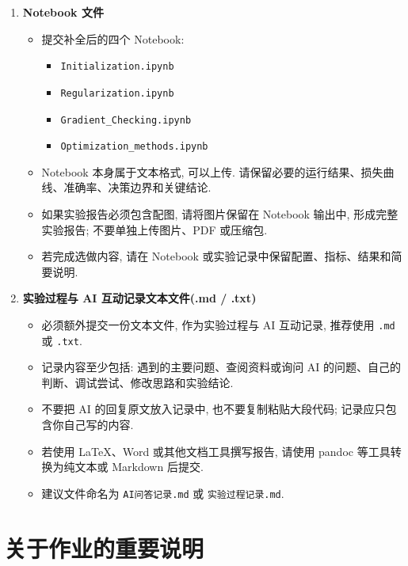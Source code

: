 \documentclass{../../nndlcourse}
\begin{document}
\begin{enumerate}
    \item \textbf{Notebook 文件}
    \begin{itemize}
        \item 提交补全后的四个 Notebook:
        \begin{itemize}
            \item \texttt{Initialization.ipynb}
            \item \texttt{Regularization.ipynb}
            \item \texttt{Gradient\_Checking.ipynb}
            \item \texttt{Optimization\_methods.ipynb}
        \end{itemize}
        \item Notebook 本身属于文本格式, 可以上传. 请保留必要的运行结果、损失曲线、准确率、决策边界和关键结论.
        \item 如果实验报告必须包含配图, 请将图片保留在 Notebook 输出中, 形成完整实验报告; 不要单独上传图片、PDF 或压缩包.
        \item 若完成选做内容, 请在 Notebook 或实验记录中保留配置、指标、结果和简要说明.
    \end{itemize}
    \item \textbf{实验过程与 AI 互动记录文本文件(.md / .txt)}
    \begin{itemize}
        \item 必须额外提交一份文本文件, 作为实验过程与 AI 互动记录, 推荐使用 \texttt{.md} 或 \texttt{.txt}.
        \item 记录内容至少包括: 遇到的主要问题、查阅资料或询问 AI 的问题、自己的判断、调试尝试、修改思路和实验结论.
        \item 不要把 AI 的回复原文放入记录中, 也不要复制粘贴大段代码; 记录应只包含你自己写的内容.
        \item 若使用 \LaTeX{}、Word 或其他文档工具撰写报告, 请使用 pandoc 等工具转换为纯文本或 Markdown 后提交.
        \item 建议文件命名为 \texttt{AI问答记录.md} 或 \texttt{实验过程记录.md}.
    \end{itemize}
\end{enumerate}


\section{关于作业的重要说明}
\end{document}
